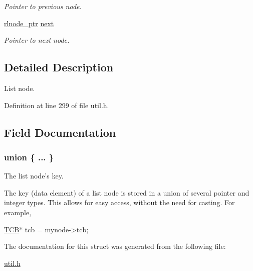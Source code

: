 \begin{DoxyCompactItemize}
\begin{DoxyCompactList}\small\item\em Pointer to previous node. \end{DoxyCompactList}\item 
\hypertarget{structresource__list__node_a04b1ee9524cd800f14de2925141e3762}{\hyperlink{group__rlists_gaae2ea9be18d20f0c80a62a2f8e2eed4d}{rlnode\-\_\-ptr} \hyperlink{structresource__list__node_a04b1ee9524cd800f14de2925141e3762}{next}}\label{structresource__list__node_a04b1ee9524cd800f14de2925141e3762}

\begin{DoxyCompactList}\small\item\em Pointer to next node. \end{DoxyCompactList}\end{DoxyCompactItemize}


\subsection{Detailed Description}
List node. 

Definition at line 299 of file util.\-h.



\subsection{Field Documentation}
\hypertarget{structresource__list__node_aba8874eccf1ac3e7657c726a4f86536c}{\subsubsection[{"@5}]{\setlength{\rightskip}{0pt plus 5cm}union \{ ... \} }}\label{structresource__list__node_aba8874eccf1ac3e7657c726a4f86536c}


The list node's key. 

The key (data element) of a list node is stored in a union of several pointer and integer types. This allows for easy access, without the need for casting. For example, 
\begin{DoxyCode}
\hyperlink{structthread__control__block}{TCB}* tcb = mynode->tcb;
\end{DoxyCode}
 

The documentation for this struct was generated from the following file\-:\begin{DoxyCompactItemize}
\item 
\hyperlink{util_8h}{util.\-h}\end{DoxyCompactItemize}
